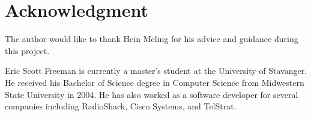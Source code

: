 \documentclass[10pt,journal,compsoc]{IEEEtran}
\begin{document}
		\section*{Acknowledgment}
	\fi
	
	The author would like to thank Hein Meling for his advice and guidance during this project.
	
	
	

\begin{IEEEbiographynophoto}{Eric Scott Freeman}
is currently a master's student at the University of Stavanger. He received his Bachelor of Science degree in Computer Science from Midwestern State University in 2004. He has also worked as a software developer for several companies including RadioShack, Cisco Systems, and TelStrat.
\end{IEEEbiographynophoto}
\end{document}
